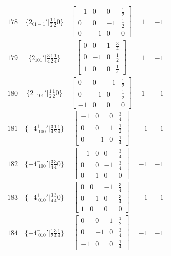 \documentclass[fleqn,8pt]{jsarticle}
\begin{document}
\begin{longtable}{ccccc}
$ 178 $ & $ \{2{}_{01-1}{}'|\frac{1}{2} \frac{1}{2} 0\} $ & $ \begin{bmatrix} -1 & 0 & 0 & \frac{1}{2} \\ 0 & 0 & -1 & \frac{1}{2} \\ 0 & -1 & 0 & 0 \end{bmatrix} $ & $ 1 $ & $ -1 $ \\ \hline
$ 179 $ & $ \{2{}_{101}{}'|\frac{3}{4} \frac{1}{2} \frac{1}{4}\} $ & $ \begin{bmatrix} 0 & 0 & 1 & \frac{3}{4} \\ 0 & -1 & 0 & \frac{1}{2} \\ 1 & 0 & 0 & \frac{1}{4} \end{bmatrix} $ & $ 1 $ & $ -1 $ \\ \hline
$ 180 $ & $ \{2{}_{-101}{}'|\frac{1}{2} \frac{1}{2} 0\} $ & $ \begin{bmatrix} 0 & 0 & -1 & \frac{1}{2} \\ 0 & -1 & 0 & \frac{1}{2} \\ -1 & 0 & 0 & 0 \end{bmatrix} $ & $ 1 $ & $ -1 $ \\ \hline
$ 181 $ & $ \{-4^{+}_{\,\,100}{}'|\frac{3}{4} \frac{1}{2} \frac{1}{4}\} $ & $ \begin{bmatrix} -1 & 0 & 0 & \frac{3}{4} \\ 0 & 0 & 1 & \frac{1}{2} \\ 0 & -1 & 0 & \frac{1}{4} \end{bmatrix} $ & $ -1 $ & $ -1 $ \\ \hline
$ 182 $ & $ \{-4^{-}_{\,\,100}{}'|\frac{3}{4} \frac{3}{4} 0\} $ & $ \begin{bmatrix} -1 & 0 & 0 & \frac{3}{4} \\ 0 & 0 & -1 & \frac{3}{4} \\ 0 & 1 & 0 & 0 \end{bmatrix} $ & $ -1 $ & $ -1 $ \\ \hline
$ 183 $ & $ \{-4^{+}_{\,\,010}{}'|\frac{3}{4} \frac{3}{4} 0\} $ & $ \begin{bmatrix} 0 & 0 & -1 & \frac{3}{4} \\ 0 & -1 & 0 & \frac{3}{4} \\ 1 & 0 & 0 & 0 \end{bmatrix} $ & $ -1 $ & $ -1 $ \\ \hline
$ 184 $ & $ \{-4^{-}_{\,\,010}{}'|\frac{1}{2} \frac{3}{4} \frac{1}{4}\} $ & $ \begin{bmatrix} 0 & 0 & 1 & \frac{1}{2} \\ 0 & -1 & 0 & \frac{3}{4} \\ -1 & 0 & 0 & \frac{1}{4} \end{bmatrix} $ & $ -1 $ & $ -1 $ \\ \hline

\end{longtable}
\end{document}
